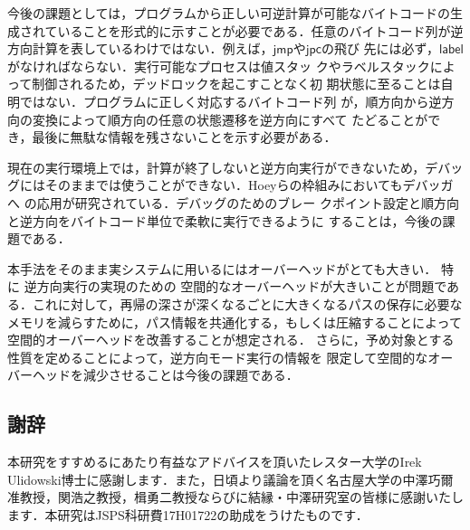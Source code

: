 \documentclass[submit,PRO]{ipsj}
\newcommand{\bcode}[1]{$\mathsf{#1}$}
\begin{document}
今後の課題としては，プログラムから正しい可逆計算が可能なバイトコードの生
成されていることを形式的に示すことが必要である．任意のバイトコード列が逆
方向計算を表しているわけではない．例えば，\bcode{jmp}や\bcode{jpc}の飛び
先には必ず，\bcode{label}がなければならない．実行可能なプロセスは値スタッ
クやラベルスタックによって制御されるため，デッドロックを起こすことなく初
期状態に至ることは自明ではない．プログラムに正しく対応するバイトコード列
が，順方向から逆方向の変換によって順方向の任意の状態遷移を逆方向にすべて
たどることができ，最後に無駄な情報を残さないことを示す必要がある．

現在の実行環境上では，計算が終了しないと逆方向実行ができないため，デバッ
グにはそのままでは使うことができない．Hoeyらの枠組みにおいてもデバッガへ
の応用が研究されている\cite{DBLP:conf/rc/HoeyU19}．デバッグのためのブレー
クポイント設定と順方向と逆方向をバイトコード単位で柔軟に実行できるように
することは，今後の課題である．

本手法をそのまま実システムに用いるにはオーバーヘッドがとても大きい．
特に%
逆方向実行の実現のための%
空間的なオーバーヘッドが大きいことが問題である．これに対して，再帰の深さが深くなるごとに大きくなるパスの保存に必要なメモリを減らすために，パス情報を共通化する，もしくは圧縮することによって空間的オーバーヘッドを改善することが想定される．
さらに，予め対象とする性質を定めることによって，逆方向モード実行の情報を
限定して空間的なオーバーヘッドを減少させることは今後の課題である．

\subsection*{謝辞}

本研究をすすめるにあたり有益なアドバイスを頂いたレスター大学のIrek
Ulidowski博士に感謝します．また，日頃より議論を頂く名古屋大学の中澤巧爾
准教授，関浩之教授，楫勇二教授ならびに結縁・中澤研究室の皆様に感謝いたし
ます．本研究はJSPS科研費17H01722の助成をうけたものです．



\end{document}
